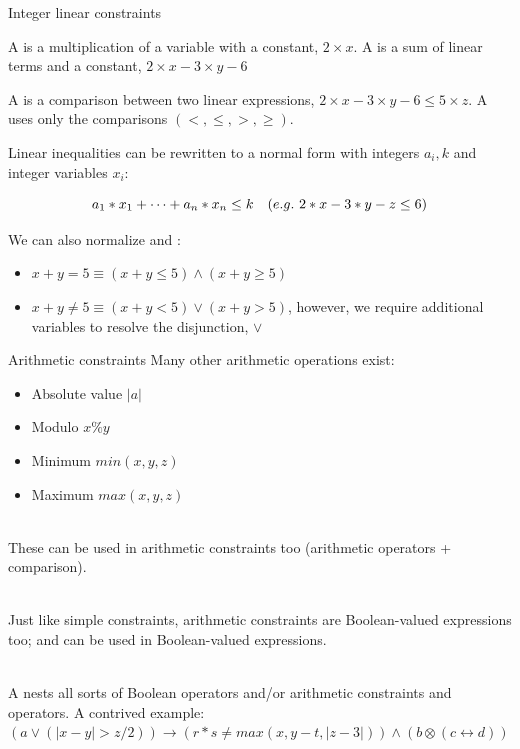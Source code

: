 \documentclass{cons-beamer}
\begin{document}
\begin{frame}{Integer linear constraints}


	A  is a multiplication of a variable with a constant, \eg $2 \times x$.
	A  is a sum of linear terms and a constant, \eg $2 \times x - 3 \times y - 6$
	\parBreak

	A  is a comparison between two linear expressions, \eg $2 \times x - 3 \times y - 6 \leq 5 \times z$.
	A  uses only the comparisons $(<, \leq, >, \geq)$.

	\parBreak
	 Linear inequalities can be rewritten to a normal form with integers $a_i, k$ and integer variables $x_i$:

	$$
	a_1 * x_1 + \cdots + a_n * x_n \leq k \quad (e.g.~2 * x - 3 * y - z \leq 6)
	$$

	\parBreak
	We can also normalize  and :

	\begin{itemize}
		\item $x + y = 5 \equiv (x + y \leq 5) \land (x + y \geq 5)$
		\item $x + y \neq 5 \equiv (x + y < 5) \lor (x + y > 5)$, however, we require additional variables to resolve the disjunction, $\lor$
	\end{itemize}

\end{frame}

\begin{frame}{Arithmetic constraints}
  Many other arithmetic operations exist:

  \begin{itemize}
    \item Absolute value $|a|$
    \item Modulo $x \% y$
    \item Minimum $min(x,y,z)$
    \item Maximum $max(x,y,z)$
  \end{itemize}

  $ $\\
  These can be used in arithmetic constraints too (\eg arithmetic operators + comparison).

  $ $\\
  Just like simple constraints, arithmetic constraints are Boolean-valued expressions too; and can be used in Boolean-valued expressions.

  $ $\\
  A  nests all sorts of Boolean operators and/or arithmetic constraints and operators. A contrived example: $(a \vee (|x - y| > z/2)) \rightarrow (r * s \neq  max(x, y-t, |z-3|)) \wedge (b \otimes (c \leftrightarrow  d))$

\end{frame}
\end{document}
